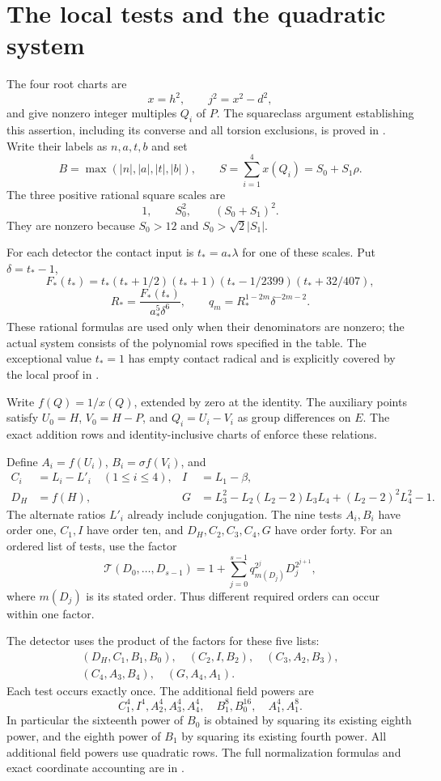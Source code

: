 \documentclass[11pt,a4paper]{article}
\theoremstyle{remark}\newtheorem{remark}[theorem]{Remark}
\begin{document}
\section{The local tests and the quadratic system}
The four root charts are
\[
 x=h^2,\qquad j^2=x^2-d^2,
\]
and give nonzero integer multiples $Q_i$ of $P$. The squareclass
argument establishing this assertion, including its converse and all
torsion exclusions, is proved in \cite[Section~2]{Baseline}.
Write their labels as $n,a,t,b$ and set
\[
 B=\max(|n|,|a|,|t|,|b|),\qquad
 S=\sum_{i=1}^4x(Q_i)=S_0+S_1\rho.
\]
The three positive rational square scales are
\[
                         1,\qquad S_0^2,\qquad(S_0+S_1)^2.
\]
They are nonzero because $S_0>12$ and $S_0>\sqrt2|S_1|$.

For each detector the contact input is $t_*=a_*\lambda$ for one of
these scales. Put $\delta=t_*-1$,
\[
 F_*(t_*)=t_*(t_*+1/2)(t_*+1)(t_*-1/2399)(t_*+32/407),
\]
\[
 R_*=\frac{F_*(t_*)}{a_*^5\delta^6},\qquad
 q_m=R_*^{1-2m}\delta^{-2m-2}.
\]
These rational formulas are used only when their denominators are
nonzero; the actual system consists of the polynomial rows specified
in the table. The exceptional value $t_*=1$ has empty contact radical
and is explicitly covered by the local proof in \cite{Packing}.

Write $f(Q)=1/x(Q)$, extended by zero at the identity. The auxiliary
points satisfy $U_0=H$, $V_0=H-P$, and $Q_i=U_i-V_i$ as group
differences on $E$. The exact addition rows and identity-inclusive
charts of \cite{Baseline} enforce these relations.

Define $A_i=f(U_i)$, $B_i=\sigma f(V_i)$, and
\[
 \begin{aligned}
 C_i&=L_i-L'_i\quad(1\le i\le4),& I&=L_1-\beta,\\
 D_H&=f(H),&G&=L_3^2-L_2(L_2-2)L_3L_4+(L_2-2)^2L_4^2-1.
 \end{aligned}
\]
The alternate ratios $L'_i$ already include conjugation. The nine tests
$A_i,B_i$ have order one, $C_1,I$ have order ten, and $D_H,C_2,C_3,C_4,G$
have order forty. For an ordered list of tests, use the factor
\[
 \mathcal T(D_0,\ldots,D_{s-1})
 =1+\sum_{j=0}^{s-1}q_{m(D_j)}^{2^j}D_j^{2^{j+1}},
\]
where $m(D_j)$ is its stated order. Thus different required orders can
occur within one factor.

The detector uses the product of the factors for these five lists:
\[
 \begin{gathered}
 (D_H,C_1,B_1,B_0),\quad(C_2,I,B_2),\quad(C_3,A_2,B_3),\\
 (C_4,A_3,B_4),\quad(G,A_4,A_1).
 \end{gathered}
\]
Each test occurs exactly once. The additional field powers are
\[
 C_1^4,I^4,A_2^4,A_3^4,A_4^4,\quad B_1^8,B_0^{16},\quad A_1^4,A_1^8.
\]
In particular the sixteenth power of $B_0$ is obtained by squaring its
existing eighth power, and the eighth power of $B_1$ by squaring its
existing fourth power. All additional field powers use quadratic rows.
The full normalization formulas and exact coordinate accounting are
in \cite{Packing}.
\end{document}
